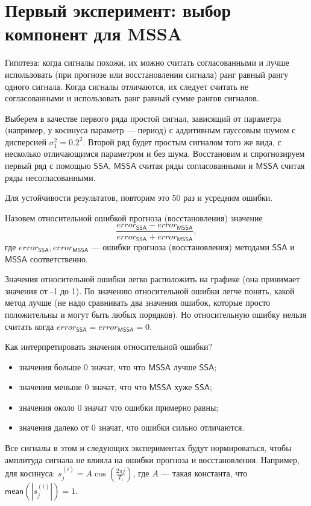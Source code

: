 \documentclass[specialist, substylefile = spbureport.rtx,
    subf,href,colorlinks=true, 12pt]{disser}
\newcommand{\SSA}{\mathsf{SSA}}
\newcommand{\MSSA}{\mathsf{MSSA}}
\newcommand{\mean}{\mathsf{mean}}
\begin{document}
    \section{Первый эксперимент: выбор компонент для MSSA}
        Гипотеза: когда сигналы похожи, их можно считать согласованными и лучше использовать (при прогнозе или восстановлении сигнала) ранг равный рангу одного сигнала. Когда сигналы отличаются, их следует считать не согласованными и использовать ранг равный сумме рангов сигналов.

        Выберем в качестве первого ряда простой сигнал, зависящий от параметра (например, у косинуса параметр --- период) с аддитивным гауссовым шумом с дисперсией $\sigma_1^2 = 0.2^2$.
        Второй ряд будет простым сигналом того же вида, с несколько отличающимся параметром и без шума.
        Восстановим и спрогнозируем первый ряд с помощью $\SSA$, $\MSSA$ считая ряды согласованными и $\MSSA$ считая ряды несогласованными.

        Для устойчивости результатов, повторим это 50 раз и усредним ошибки.

        Назовем относительной ошибкой прогноза (восстановления) значение $$\displaystyle \frac{error_{\SSA} - error_{\MSSA}}{error_{\SSA} + error_{\MSSA}},$$ где $error_{\SSA}, error_{\MSSA}$ --- ошибки прогноза (восстановления) методами $\SSA$ и $\MSSA$ соответственно.
        
        Значения относительной ошибки легко расположить на графике (она принимает значения от -1 до 1). По значению относительной ошибки легче понять, какой метод лучше (не надо сравнивать два значения ошибок, которые просто положительны и могут быть любых порядков). Но относительную ошибку нельзя считать когда $error_{\SSA} = error_{\MSSA} = 0$.
        
        Как интерпретировать значения относительной ошибки? 
        \begin{itemize}
            \item значения больше $0$ значат, что что $\MSSA$ лучше $\SSA$;
            \item значения меньше $0$ значат, что что $\MSSA$ хуже $\SSA$;
            \item значения около $0$ значат что ошибки примерно равны;
            \item значения далеко от $0$ значат, что ошибки сильно отличаются.
        \end{itemize}

        Все сигналы в этом и следующих экспериментах будут нормироваться, чтобы амплитуда сигнала не влияла на ошибки прогноза и восстановления. Например, для косинуса: $s_j^{(i)} = A \cos(\frac{2\pi j}{T_i})$, где $A$ --- такая константа, что $\mean(|s_j^{(i)}|) = 1$.
\end{document}
